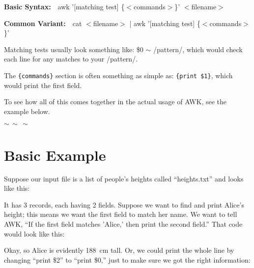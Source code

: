 \documentclass[10pt,a4]{article}
\begin{document}
\textbf{Basic Syntax:} \,\, \ttfamily awk '[matching test] \{$<$commands$>$\}' $<$filename$>$ \normalfont

\textbf{Common Variant:} \,\, \ttfamily cat $<$filename$>$ | awk '[matching test] \{$<$commands$>$\}' \normalfont

Matching tests usually look something like: \$0 $\sim$ /pattern/, which would check each line for any matches to your /pattern/.

The \texttt{\{commands\}} section is often something as simple as: \texttt{\{print \$1\}}, which would print the first field.

To see how all of this comes together in the actual usage of AWK, see the example below.

\large
$\sim \, \sim \, \sim$
\normalsize


\pagebreak


\section*{Basic Example}

Suppose our input file is a list of people's heights called ``heights.txt'' and looks like this:

\ttfamily
\colorbox{black}{}
\normalfont

It has 3 records, each having 2 fields. Suppose we want to find and print Alice's height; this means we want the first field to match her name. We want to tell AWK, ``If the first field matches 'Alice,' then print the second field.'' That code would look like this:

\ttfamily
\colorbox{black}{}
\normalfont

Okay, so Alice is evidently 188~cm tall. Or, we could print the whole line by changing ``print \$2'' to ``print \$0,'' just to make sure we got the right information:
\end{document}
